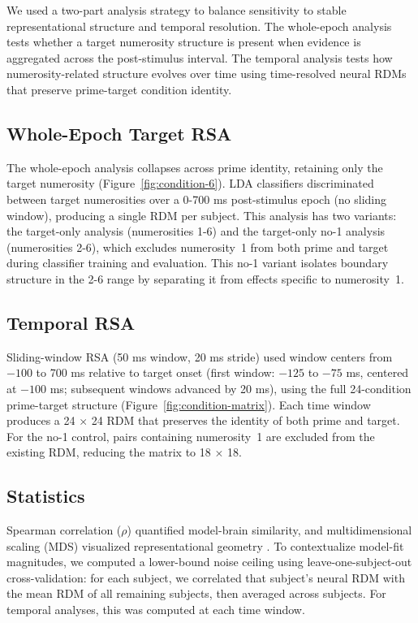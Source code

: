 

We used a two-part analysis strategy to balance sensitivity to stable
representational structure and temporal resolution. The whole-epoch
analysis tests whether a target numerosity structure is present when
evidence is aggregated across the post-stimulus interval. The temporal
analysis tests how numerosity-related structure evolves over time using
time-resolved neural RDMs that preserve prime-target condition
identity.

\subsection{Whole-Epoch Target RSA}
The whole-epoch analysis collapses across prime identity, retaining
only the target numerosity (Figure~\ref{fig:condition-6}). LDA classifiers discriminated between
target numerosities over a 0-700 ms post-stimulus epoch (no sliding
window), producing a single RDM per subject. This analysis
has two variants: the target-only analysis (numerosities 1-6) and the
target-only no-1 analysis (numerosities 2-6), which excludes
numerosity~1 from both prime and target during classifier training
and evaluation. This no-1 variant isolates boundary structure in the
2-6 range by separating it from effects specific to numerosity~1.

\subsection{Temporal RSA}
Sliding-window RSA (50 ms window, 20 ms stride) used window
centers from $-100$ to 700 ms relative to target onset (first
window: $-125$ to $-75$ ms, centered at $-100$ ms; subsequent windows
advanced by 20 ms), using the full 24-condition prime-target structure
(Figure~\ref{fig:condition-matrix}). Each time window produces a
24 $\times$ 24 RDM that preserves the identity of both prime and
target. For the no-1 control, pairs containing numerosity~1 are
excluded from the existing RDM,
reducing the matrix to 18 $\times$ 18.

\subsection{Statistics}
Spearman correlation ($\rho$) quantified model-brain similarity, and
multidimensional scaling (MDS) visualized representational geometry
\citep{Kriegeskorte2008}. To contextualize model-fit magnitudes, we
computed a lower-bound noise ceiling using leave-one-subject-out
cross-validation: for each subject, we correlated that subject's neural
RDM with the mean RDM of all remaining subjects, then averaged across
subjects. For temporal analyses, this was computed at each time window.

